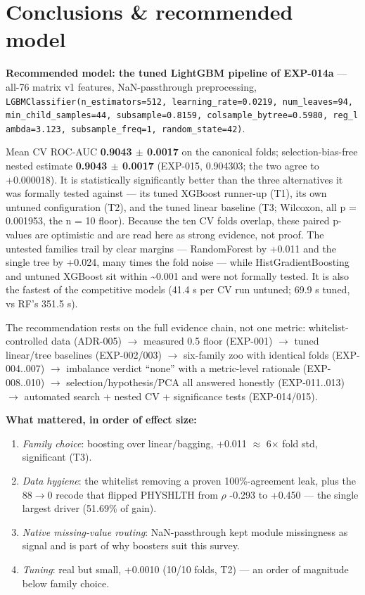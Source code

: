 \documentclass[11pt,a4paper]{article}
\providecommand{\tightlist}{\setlength{\itemsep}{2pt}\setlength{\parskip}{0pt}}
\begin{document}
\section{Conclusions \& recommended
model}\label{conclusions-recommended-model}

\textbf{Recommended model: the tuned LightGBM pipeline of EXP-014a} ---
all-76 matrix v1 features, NaN-passthrough preprocessing,
\texttt{LGBMClassifier(n\_estimators=512,\ learning\_rate=0.0219,\ num\_leaves=94,\ min\_child\_samples=44,\ subsample=0.8159,\ colsample\_bytree=0.5980,\ reg\_lambda=3.123,\ subsample\_freq=1,\ random\_state=42)}.

Mean CV ROC-AUC \textbf{0.9043 $\pm$ 0.0017} on the canonical folds;
selection-bias-free nested estimate \textbf{0.9043 $\pm$ 0.0017} (EXP-015,
0.904303; the two agree to +0.000018). It is statistically significantly
better than the three alternatives it was formally tested against ---
its tuned XGBoost runner-up (T1), its own untuned configuration (T2),
and the tuned linear baseline (T3; Wilcoxon, all p = 0.001953, the n =
10 floor). Because the ten CV folds overlap, these paired p-values are
optimistic and are read here as strong evidence, not proof. The untested
families trail by clear margins --- RandomForest by +0.011 and the
single tree by +0.024, many times the fold noise --- while
HistGradientBoosting and untuned XGBoost sit within \textasciitilde0.001
and were not formally tested. It is also the fastest of the competitive
models (41.4 s per CV run untuned; 69.9 s tuned, vs RF's 351.5 s).

The recommendation rests on the full evidence chain, not one metric:
whitelist-controlled data (ADR-005) $\rightarrow$ measured 0.5 floor (EXP-001) $\rightarrow$
tuned linear/tree baselines (EXP-002/003) $\rightarrow$ six-family zoo with
identical folds (EXP-004..007) $\rightarrow$ imbalance verdict ``none'' with a
metric-level rationale (EXP-008..010) $\rightarrow$ selection/hypothesis/PCA all
answered honestly (EXP-011..013) $\rightarrow$ automated search + nested CV +
significance tests (EXP-014/015).

\textbf{What mattered, in order of effect size:}

\begin{enumerate}
\def\labelenumi{\arabic{enumi}.}
\tightlist
\item
  \emph{Family choice}: boosting over linear/bagging, +0.011 $\approx$ 6$\times$ fold
  std, significant (T3).
\item
  \emph{Data hygiene}: the whitelist removing a proven 100\%-agreement
  leak, plus the 88$\rightarrow$0 recode that flipped PHYSHLTH from $\rho$ -0.293 to
  +0.450 --- the single largest driver (51.69\% of gain).
\item
  \emph{Native missing-value routing}: NaN-passthrough kept module
  missingness as signal and is part of why boosters suit this survey.
\item
  \emph{Tuning}: real but small, +0.0010 (10/10 folds, T2) --- an order
  of magnitude below family choice.
\end{enumerate}
\end{document}
